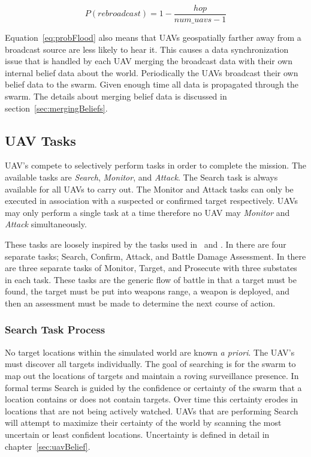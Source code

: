 \begin{equation}
\label{eq:probFlood}
P(rebroadcast) = 1 - \frac{hop}{num\_uavs - 1}
\end{equation}

Equation~\ref{eq:probFlood} also means that UAVs geospatially farther away from a broadcast source are less likely to hear it.  This causes a data synchronization issue that is handled by each UAV merging the broadcast data with their own internal belief data about the world.  Periodically the UAVs broadcast their own belief data to the swarm.  Given enough time all data is propagated through the swarm. The details about merging belief data is discussed in section~\ref{sec:mergingBeliefs}.


\subsection{UAV Tasks}
UAV's compete to selectively perform tasks in order to complete the mission.  The available tasks are \textit{Search}, \textit{Monitor}, and \textit{Attack}.  The Search task is always available for all UAVs to carry out.  The Monitor and Attack tasks can only be executed in association with a suspected or confirmed target respectively.  UAVs may only perform a single task at a time therefore no UAV may \textit{Monitor} and \textit{Attack} simultaneously.

These tasks are loosely inspired by the tasks used in~\textcite{jin} and \textcite{wtaSurvey}.  In \textcite{jin} there are four separate tasks; Search, Confirm, Attack, and Battle Damage Assessment.  In \textcite{wtaSurvey} there are three separate tasks of Monitor, Target, and Prosecute with three substates in each task.  These tasks are the generic flow of battle in that a target must be found, the target must be put into weapons range, a weapon is deployed, and then an assessment must be made to determine the next course of action.

\subsubsection{Search Task Process}
No target locations within the simulated world are known \textit{a priori}.  The UAV's must discover all targets individually.  The goal of searching is for the swarm to map out the locations of targets and maintain a roving surveillance presence. In formal terms Search is guided by the confidence or certainty of the swarm that a location contains or does not contain targets.  Over time this certainty erodes in locations that are not being actively watched.  UAVs that are performing Search will attempt to maximize their certainty of the world by scanning the most uncertain or least confident locations.  Uncertainty is defined in detail in chapter~\ref{sec:uavBelief}.

